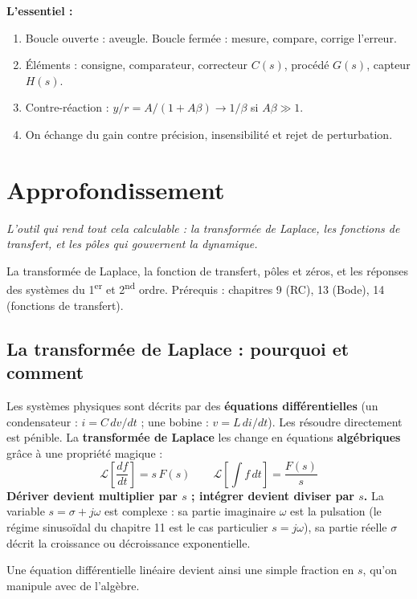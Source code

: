 \documentclass[12pt,a4paper,twoside]{book}
\begin{document}
\begin{retenir}
\textbf{L'essentiel :}
\begin{enumerate}[nosep]
\item Boucle ouverte : aveugle. Boucle fermée : mesure, compare, corrige l'erreur.
\item Éléments : consigne, comparateur, correcteur $C(s)$, procédé $G(s)$, capteur $H(s)$.
\item Contre-réaction : $y/r = A/(1+A\beta) \to 1/\beta$ si $A\beta \gg 1$.
\item On échange du gain contre précision, insensibilité et rejet de perturbation.
\end{enumerate}
\end{retenir}

\section{Approfondissement}

\vspace{0.3cm}
\textit{L'outil qui rend tout cela calculable : la transformée de Laplace, les fonctions de transfert, et les pôles qui gouvernent la dynamique.}
\vspace{0.3cm}

\begin{approfondissement}
La transformée de Laplace, la fonction de transfert, pôles et zéros, et les réponses des systèmes du 1\textsuperscript{er} et 2\textsuperscript{nd} ordre. Prérequis : chapitres 9 (RC), 13 (Bode), 14 (fonctions de transfert).
\end{approfondissement}

\subsection{La transformée de Laplace : pourquoi et comment}

\begin{formule}
Les systèmes physiques sont décrits par des \textbf{équations différentielles} (un condensateur : $i = C\,dv/dt$ ; une bobine : $v = L\,di/dt$). Les résoudre directement est pénible. La \textbf{transformée de Laplace} les change en équations \textbf{algébriques} grâce à une propriété magique :
\[
\mathcal{L}\!\left[\frac{df}{dt}\right] = s\,F(s) \qquad \mathcal{L}\!\left[\int f\,dt\right] = \frac{F(s)}{s}
\]
\textbf{Dériver devient multiplier par $s$ ; intégrer devient diviser par $s$.} La variable $s = \sigma + j\omega$ est complexe : sa partie imaginaire $\omega$ est la pulsation (le régime sinusoïdal du chapitre 11 est le cas particulier $s = j\omega$), sa partie réelle $\sigma$ décrit la croissance ou décroissance exponentielle.

Une équation différentielle linéaire devient ainsi une simple fraction en $s$, qu'on manipule avec de l'algèbre.
\end{formule}
\end{document}
